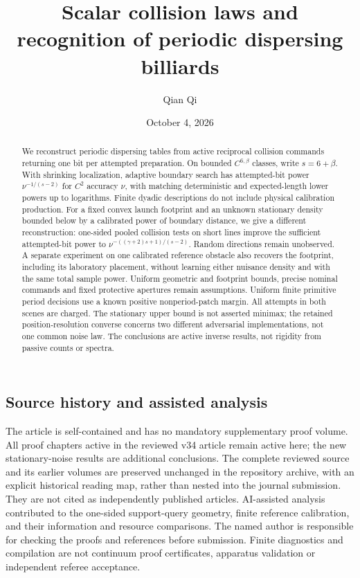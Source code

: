 \documentclass[11pt]{amsart}
\title[Scalar collision laws]{Scalar collision laws and recognition of periodic dispersing billiards}
\author{Qian Qi}
\date{October 4, 2026}
\theoremstyle{definition}\newtheorem{definition}[theorem]{Definition}
\theoremstyle{remark}\newtheorem{remark}[theorem]{Remark}
\numberwithin{equation}{section}
\begin{document}
\raggedbottom
\begin{abstract}
We reconstruct periodic dispersing tables from active reciprocal collision
commands returning one bit per attempted preparation. On bounded
$C^{6,\beta}$ classes, write $s=6+\beta$. With shrinking localization,
adaptive boundary search has attempted-bit power $\nu^{-1/(s-2)}$
for $C^2$ accuracy $\nu$, with matching deterministic and expected-length
lower powers up to logarithms. Finite dyadic descriptions do not include
physical calibration production. For a fixed convex launch footprint
and an unknown stationary density bounded below by a calibrated power
of boundary distance, we give a different reconstruction: one-sided
pooled collision tests on short lines improve the sufficient attempted-bit
power to $\nu^{-((\gamma+2)s+1)/(s-2)}$. Random directions remain
unobserved. A separate experiment on one calibrated reference obstacle
also recovers the footprint, including its laboratory placement, without
learning either nuisance density and with the same total sample power.
Uniform geometric and footprint bounds, precise nominal commands and
fixed protective apertures remain assumptions. Uniform finite primitive
period decisions use a known positive nonperiod-patch margin. All attempts
in both scenes are charged. The stationary upper bound is not asserted
minimax; the retained position-resolution converse concerns two different
adversarial implementations, not one common noise law. The conclusions
are active inverse results, not rigidity from passive counts or spectra.
\end{abstract}
\maketitle















\subsection*{Source history and assisted analysis}
The article is self-contained and has no mandatory supplementary proof
volume. All proof chapters active in the reviewed v34 article remain
active here; the new stationary-noise results are additional conclusions.
The complete reviewed source and its earlier volumes are preserved
unchanged in the repository archive, with an explicit historical reading
map, rather than nested into the journal submission. They are not cited
as independently published articles. AI-assisted analysis contributed
to the one-sided support-query geometry, finite reference calibration,
and their information and resource comparisons. The named author is responsible for checking the proofs
and references before submission. Finite diagnostics and compilation
are not continuum proof certificates, apparatus validation or independent
referee acceptance.

\end{document}
